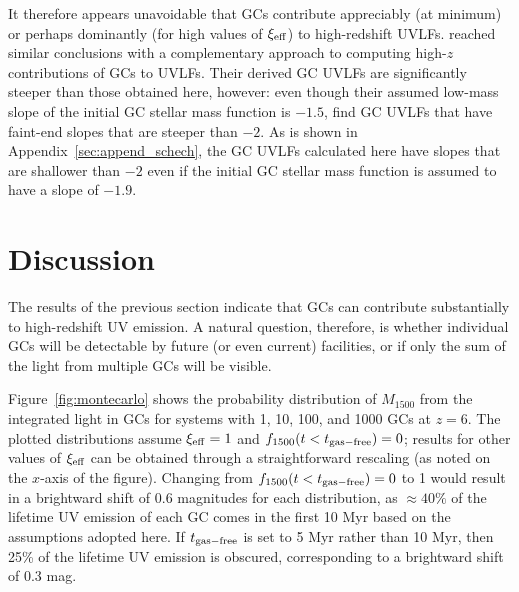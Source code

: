 \documentclass[fleqn,usenatbib]{mnras}
\newcommand{\xieff}{\xi_{\rm eff}}
\newcommand{\fescobs}{f_{1500}}
\newcommand{\tgasfree}{t_{\rm gas-free}}
\begin{document}
{It therefore appears unavoidable that GCs contribute appreciably (at minimum) or
perhaps dominantly (for high values of $\xieff$) to high-redshift
UVLFs. \citet{katz2013} reached similar conclusions with a complementary
approach to computing high-$z$ contributions of GCs to UVLFs. Their derived GC
UVLFs are significantly steeper than those obtained here, however: even though
their assumed low-mass slope of the initial GC stellar mass function is $-1.5$,
\citet{katz2013} find GC UVLFs that have faint-end slopes that are steeper than
$-2$. As is shown in Appendix~\ref{sec:append_schech}, the GC UVLFs calculated
here have slopes that are shallower than $-2$ even if the initial GC stellar
mass function is assumed to have a slope of $-1.9$. 



\section{Discussion}
\label{sec:highz}
The results of the previous section indicate that GCs can contribute
substantially to high-redshift UV emission. A natural question, therefore, is
whether individual GCs will be detectable by future (or even current) facilities, or
if only the sum of the light from multiple GCs will be visible. 

Figure~\ref{fig:montecarlo} shows the probability distribution of $M_{1500}$
from the integrated light in GCs for systems with 1, 10, 100, and 1000 GCs at
$z=6$. The plotted distributions assume $\xieff=1$ and
$\fescobs (t<\tgasfree)=0$; results for other values of $\xieff$ can be obtained
through a straightforward rescaling (as noted on the $x$-axis of the
figure). Changing from $\fescobs (t<\tgasfree)=0$ to 1 would result in a
brightward shift of 0.6 magnitudes for each distribution, as $\approx 40\%$ of
the lifetime UV emission of each GC comes in the first 10 Myr based on the
assumptions adopted here. If $\tgasfree$ is set to 5 Myr rather than 10 Myr,
then 25\% of the lifetime UV emission is obscured, corresponding to a brightward
shift of 0.3 mag.

}
\end{document}
